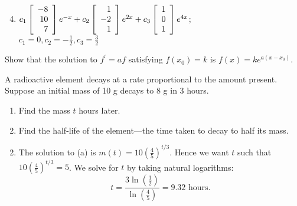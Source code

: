 \begin{multicols}{2}
\begin{ex}
\begin{sol}
\begin{enumerate}[label={\alph*.}]
\setcounter{enumi}{3}
\item   $c_1 \left[ \begin{array}{r}
-8 \\
10 \\
7
\end{array} \right] e^{-x} + c_2 \left[ \begin{array}{r}
1 \\
-2 \\
1
\end{array} \right] e^{2x} + c_3 \left[ \begin{array}{r}
1 \\
0 \\
1
\end{array} \right] e^{4x}$; \\
$c_1 = 0, c_2 = -\frac{1}{2}, c_3=\frac{3}{2}$
\end{enumerate}
\end{sol}
\end{ex}

\begin{ex}
Show that the solution to $f^{\prime}= af$ satisfying $f(x_{0}) = k$ is $f(x) = ke^{a(x-x_0)}$.
\end{ex}

\begin{ex}
A
 radioactive element decays at a rate proportional to the amount 
present. Suppose an initial mass of 10 g decays to 8 g in 3 hours.


\begin{enumerate}[label={\alph*.}]
\item Find the mass $t$ hours later.

\item Find the half-life of the element---the time taken to decay to half its mass.

\end{enumerate}
\begin{sol}
\begin{enumerate}[label={\alph*.}]
\setcounter{enumi}{1}
\item  The solution to (a) is $m(t) = 10 \left( \frac{4}{5} \right)^{t/3}$.
 Hence we want $t$ such that $10 \left( \frac{4}{5} \right)^{t/3}=5$.
 We solve for $t$ by taking natural logarithms: 
\begin{equation*}
t = \frac{3 \ln (\frac{1}{2})}{\ln (\frac{4}{5})} = 9.32 \mbox{ hours}.
\end{equation*}
\end{enumerate}
\end{sol}
\end{ex}


\end{multicols}
